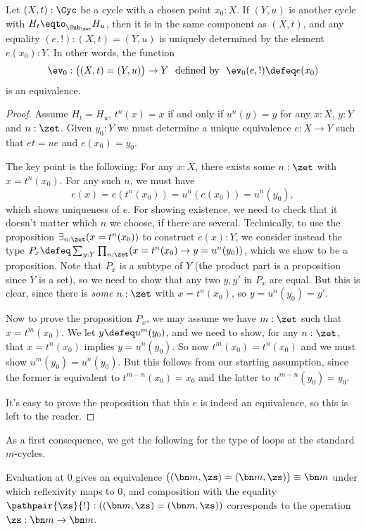 \begin{lemma}\label{lem:IdCycle}
  Let $(X,t):\Cyc$ be a cycle with a chosen point $x_0:X$.
  If $(Y,u)$ is another cycle with $H_t\eqto_{\Sub_\zet} H_u$,
  then it is in the same component as $(X,t)$,
  and any equality $(e,!) : (X,t)=(Y,u)$
  is uniquely determined by the element $e(x_0):Y$.
  In other words, the function
  \[
    \ev_0:\bigl((X,t)=(Y,u)\bigr)\to Y
    \text{~~defined by~~} \ev_0(e,!) \defeq e(x_0)
  \]
  is an equivalence.
\end{lemma}
\begin{proof}
  Assume $H_t=H_u$, \ie $t^n(x)=x$ if and only if $u^n(y)=y$
  for any $x:X$, $y:Y$ and $n:\zet$.
  Given $y_0:Y$ we must determine a unique equivalence $e:X\to Y$
  such that $et=ue$ and $e(x_0)=y_0$.

  The key point is the following: For any $x:X$, there exists some $n:\zet$
  with $x=t^n(x_0)$. For any such $n$, we must have
  \[
    e(x)=e(t^n(x_0))=u^n(e(x_0))=u^n(y_0),
  \]
  which shows uniqueness of $e$.
  For showing existence, we need to check that it doesn't matter which $n$ we choose, if there are several.
  Technically, to use the proposition $\exists_{n:\zet}(x=t^n(x_0))$ to construct $e(x):Y$, we consider instead the type $P_x\defeq\sum_{y:Y}\prod_{n:\zet}(x=t^n(x_0) \to y=u^n(y_0))$, which we show to be a proposition.
  Note that $P_x$ is a subtype of $Y$
  (the product part is a proposition since $Y$ is a set),
  so we need to show that any two $y,y'$ in $P_x$ are equal.
  But this is clear, since there is \emph{some} $n:\zet$ with $x=t^n(x_0)$,
  so $y=u^n(y_0)=y'$.

  Now to prove the proposition $P_x$,
  we may assume we have $m:\zet$ such that $x=t^m(x_0)$.
  We let $y\defeq u^m(y_0)$, and we need to show, for any $n:\zet$,
  that $x=t^n(x_0)$ implies $y=u^n(y_0)$.
  So now $t^m(x_0)=t^n(x_0)$ and we must show $u^m(y_0)=u^n(y_0)$.
  But this follows from our starting assumption, since
  the former is equivalent to $t^{m-n}(x_0)=x_0$
  and the latter to $u^{m-n}(y_0)=y_0$.

  It's easy to prove the proposition that this $e$ is indeed an equivalence,
  so this is left to the reader.
\end{proof}
As a first consequence,
we get the following for the type of loops at the standard $m$-cycles.
\begin{corollary}\label{cor:id-m-cycle}
  Evaluation at $0$ gives an equivalence
  $\bigl((\bn m,\zs)=(\bn m,\zs)\bigr) \equiv \bn m$ under which
  reflexivity maps to $0$, and composition with the equality
  $\pathpair{\zs}{!}: ((\bn m,\zs)=(\bn m,\zs))$
  corresponds to the operation $\zs:\bn m\to\bn m$.
\end{corollary}


